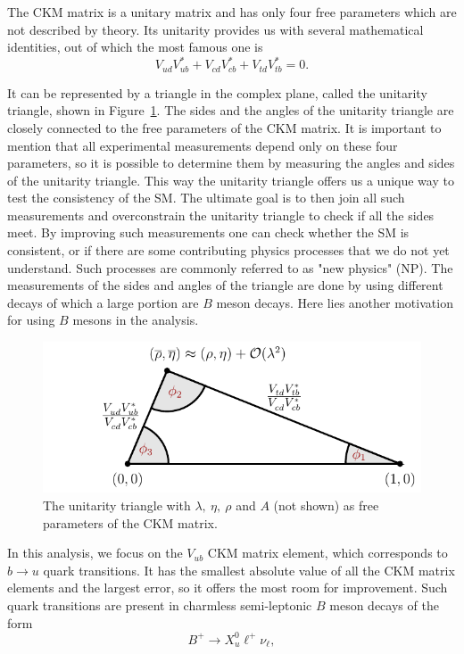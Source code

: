 The CKM matrix is a unitary matrix and has only four free parameters which are not described by theory. Its unitarity provides us with several mathematical identities, out of which the most famous one is
\begin{equation}
V_{ud}V_{ub}^* + V_{cd}V_{cb}^* + V_{td}V_{tb}^* = 0.
\end{equation}

It can be represented by a triangle in the complex plane, called the unitarity triangle, shown in Figure~\ref{ut}. The sides and the angles of the unitarity triangle are closely connected to the free parameters of the CKM matrix. It is important to mention that all experimental measurements depend only on these four parameters, so it is possible to determine them by measuring the angles and sides of the unitarity triangle. This way the unitarity triangle offers us a unique way to test the consistency of the SM. The ultimate goal is to then join all such measurements and overconstrain the unitarity triangle to check if all the sides meet. By improving such measurements one can check whether the SM is consistent, or if there are some contributing physics processes that we do not yet understand. Such processes are commonly referred to as "new physics" (NP). The measurements of the sides and angles of the triangle are done by using different decays of which a large portion are $B$ meson decays. Here lies another motivation for using $B$ mesons in the analysis.

\begin{figure}[!htb]
\centering
\includegraphics[scale=1]{texfig/UT_Triangle}
\caption{The unitarity triangle with $\lambda,~\eta,~\rho$ and $A$ (not shown) as free parameters of the CKM matrix.}
\label{ut}
\end{figure}

In this analysis, we focus on the $V_{ub}$ CKM matrix element, which corresponds to $b \to u$ quark transitions. It has the smallest absolute value of all the CKM matrix elements and the largest error, so it offers the most room for improvement. Such quark transitions are present in charmless semi-leptonic $B$ meson decays of the form
\begin{equation}
B^+ \to X_u^0 \ell^+ \nu_\ell,
\end{equation}

